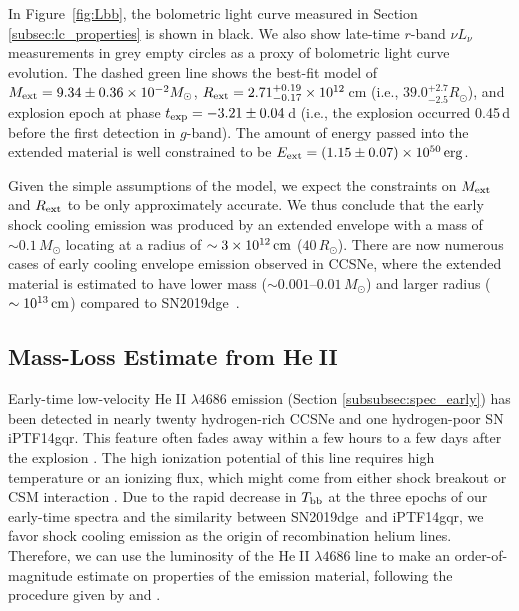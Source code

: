 \documentclass[twocolumn]{aastex63}
\newcommand{\name}{SN2019dge}
\def\ion#1#2{#1$\;${\footnotesize\rm{#2}}\relax}
\begin{document}
\begin{CJK*}{UTF8}{gbsn}
In Figure~\ref{fig:Lbb}, the bolometric light curve measured in Section \ref{subsec:lc_properties} is 
shown in black. We also show late-time $r$-band $\nu L_{\nu}$ measurements in grey empty circles as 
a proxy of bolometric light curve evolution. The dashed green line shows the best-fit model of 
$M_{\rm ext} = 9.34 \pm 0.36 \times 10^{-2} M_\odot$,
 $R_{\rm ext} =2.71_{-0.17}^{+0.19}\times10^{12}$\,cm (i.e., $39.0_{-2.5}^{+2.7} R_\odot$), 
 and explosion epoch at phase $t_{\rm exp}= -3.21 \pm 0.04$\,d (i.e., the explosion occurred 0.45\,d 
 before the first detection in $g$-band). The amount of energy passed into the extended material is 
 well constrained to be $E_{\rm ext} = (1.15\pm 0.07) \times 10^{50}\,{\rm erg}$.

Given the simple assumptions of the model, we expect the constraints on $M_{\rm ext}$ and $R_{\rm 
ext}$ to be only approximately accurate. We thus conclude that the early shock cooling emission was 
produced by an extended envelope with a mass of $\sim 0.1 \,M_\odot$ locating at a radius of $\sim 
3\times 10^{12}\,{\rm cm}$ ($40\,R_\odot$). There are now numerous cases of early cooling envelope 
emission observed in CCSNe, where the extended material is estimated to have lower mass ($\sim 
0.001$--$0.01 \, M_\odot$) and larger radius ($\sim 10^{13}\, {\rm cm}$) compared to \name\ 
\citep{Modjaz2019}. 

\subsection{Mass-Loss Estimate from \ion{He}{II}} \label{subsec:flash}
Early-time low-velocity \ion{He}{II} $\lambda4686$ emission (Section \ref{subsubsec:spec_early}) has 
been detected in nearly twenty hydrogen-rich CCSNe and one hydrogen-poor SN iPTF14gqr. This 
feature often fades away within a few hours to a few days after the explosion \citep{Yaron2017}. The 
high ionization potential of this line requires high temperature or an ionizing flux, which might come 
from either shock breakout or CSM interaction \citep{GalYam2014, Smith2015}. Due to the rapid 
decrease in $T_{\rm bb}$ at the three epochs of our early-time spectra and the similarity between 
\name\ and iPTF14gqr, we favor shock cooling emission as the origin of recombination helium 
lines. Therefore, we can use the luminosity of the \ion{He}{II} $\lambda4686$ line to make an 
order-of-magnitude estimate on properties of the emission material, following the procedure given by 
\citet{Ofek2013} and \citet{De2018}.


\end{CJK*}
\end{document}
